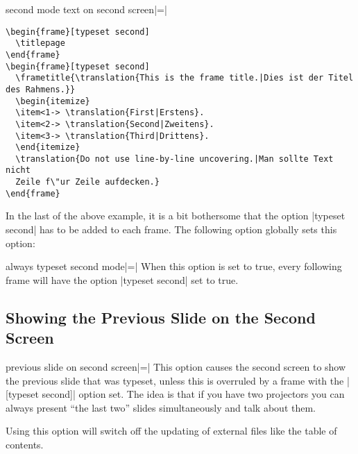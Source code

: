 \begin{beameroption}{second mode text on second screen}{|=|}
\begin{verbatim}
\begin{frame}[typeset second]
  \titlepage
\end{frame}
\begin{frame}[typeset second]
  \frametitle{\translation{This is the frame title.|Dies ist der Titel des Rahmens.}}
  \begin{itemize}
  \item<1-> \translation{First|Erstens}.
  \item<2-> \translation{Second|Zweitens}.
  \item<3-> \translation{Third|Drittens}.
  \end{itemize}
  \translation{Do not use line-by-line uncovering.|Man sollte Text nicht
  Zeile f\"ur Zeile aufdecken.}
\end{frame}

\end{verbatim}
\end{beameroption}

In the last of the above example, it is a bit bothersome that the option |typeset second| has to be added to each frame. The following option globally sets this option:

\begin{beameroption}{always typeset second mode}{|=|}
  When this option is set to true, every following frame will have the option |typeset second| set to true.
\end{beameroption}


\subsection{Showing the Previous Slide on the Second Screen}

\begin{beameroption}{previous slide on second screen}{|=|}
  This option causes the second screen to show the previous slide that was typeset, unless this is overruled by a frame with the |[typeset second]| option set. The idea is that if you have two projectors you can always present ``the last two'' slides simultaneously and talk about them.

  Using this option will switch off the updating of external files like the table of contents.
\end{beameroption}
